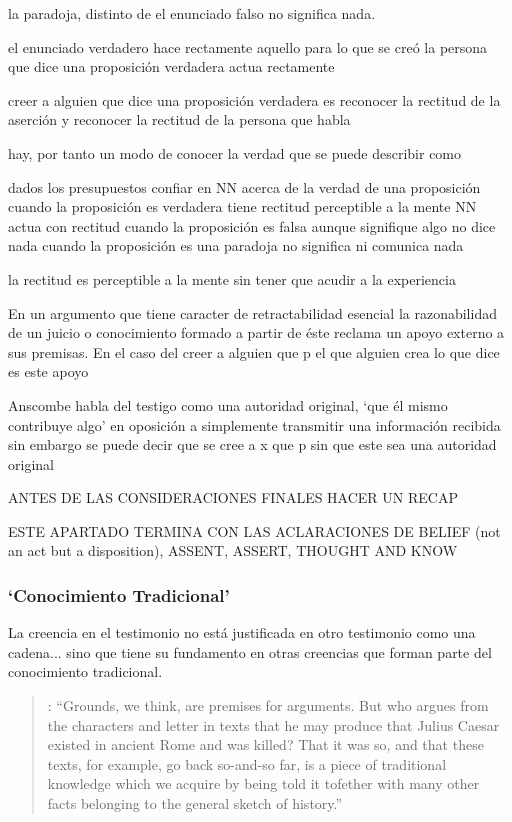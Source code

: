 la paradoja, distinto de el enunciado falso no significa nada.

el enunciado verdadero hace rectamente aquello para lo que se creó
la persona que dice una proposición verdadera actua rectamente

creer a alguien que dice una proposición verdadera es reconocer la rectitud de la aserción y reconocer la rectitud de la persona que habla

hay, por tanto un modo de conocer la verdad que se puede describir como

dados los presupuestos
confiar en NN acerca de la verdad de una proposición
cuando la proposición es verdadera tiene rectitud perceptible a la mente
NN actua con rectitud
cuando la proposición es falsa aunque signifique algo no dice nada
cuando la proposición es una paradoja no significa ni comunica nada

la rectitud es perceptible a la mente sin tener que acudir a la experiencia

En un argumento que tiene caracter de retractabilidad esencial la razonabilidad de un juicio o conocimiento formado a partir de éste reclama un apoyo externo a sus premisas. En el caso del creer a alguien que p el que alguien crea lo que dice es este apoyo

Anscombe habla del testigo como una autoridad original, `que él mismo contribuye algo' en oposición a simplemente transmitir una información recibida sin embargo se puede decir que se cree a x que p sin que este sea una autoridad original

ANTES DE LAS CONSIDERACIONES FINALES HACER UN RECAP

ESTE APARTADO TERMINA CON LAS ACLARACIONES DE BELIEF (not an act but a disposition), ASSENT, ASSERT, THOUGHT AND KNOW

\subsubsection{`Conocimiento Tradicional'}

La creencia en el testimonio no está justificada en otro testimonio como una cadena... sino que tiene su fundamento en otras creencias que forman parte del conocimiento tradicional.

\blockquote[{\cite[121--122]{anscombe2015logic:grounds}}: \enquote{Grounds, we think, are premises for arguments. But who argues from the characters and letter in texts that he may produce that Julius Caesar existed in ancient Rome and was killed? That it was so, and that these texts, for example, go back so-and-so far, is a piece of traditional knowledge which we acquire by being told it tofether with many other facts belonging to the general sketch of history.}]{}

